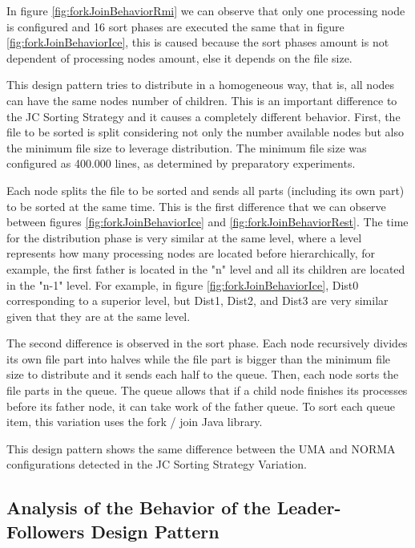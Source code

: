 In figure \ref{fig:forkJoinBehaviorRmi} we can observe that only one processing node is configured and 16 sort phases are executed the same that in figure \ref{fig:forkJoinBehaviorIce}, this is caused because the sort phases amount is not dependent of processing nodes amount, else it depends on the file size.

This design pattern tries to distribute in a homogeneous way, that is, all nodes can have the same nodes number of children. This is an important difference to the JC Sorting Strategy and it causes a completely different behavior. First, the file to be sorted is split considering not only the number available nodes but also the minimum file size to leverage distribution. The minimum file size was configured as 400.000 lines, as determined by preparatory experiments. 

Each node splits the file to be sorted and sends all parts (including its own part)  to be sorted at the same time. This is the first difference that we can observe between figures \ref{fig:forkJoinBehaviorIce} and \ref{fig:forkJoinBehaviorRest}. The time for the distribution phase is very similar at the same level, where a level represents how many processing nodes are located before hierarchically, for example, the first father is located in the "n" level and all its children are located in the "n-1" level. For example, in figure \ref{fig:forkJoinBehaviorIce}, Dist0 corresponding to a superior level, but Dist1, Dist2, and Dist3 are very similar given that they are at the same level.

The second difference is observed in the sort phase. Each node recursively divides its own file part into halves while the file part is bigger than the minimum file size to distribute and it sends each half to the queue. Then, each node sorts the file parts in the queue. The queue allows that if a child node finishes its processes before its father node, it can take work of the father queue. To sort each queue item, this variation uses the fork / join Java library.

This design pattern shows the same difference between the UMA and NORMA configurations detected in the JC Sorting Strategy Variation.

\subsection{Analysis of the Behavior of the Leader-Followers Design Pattern }

